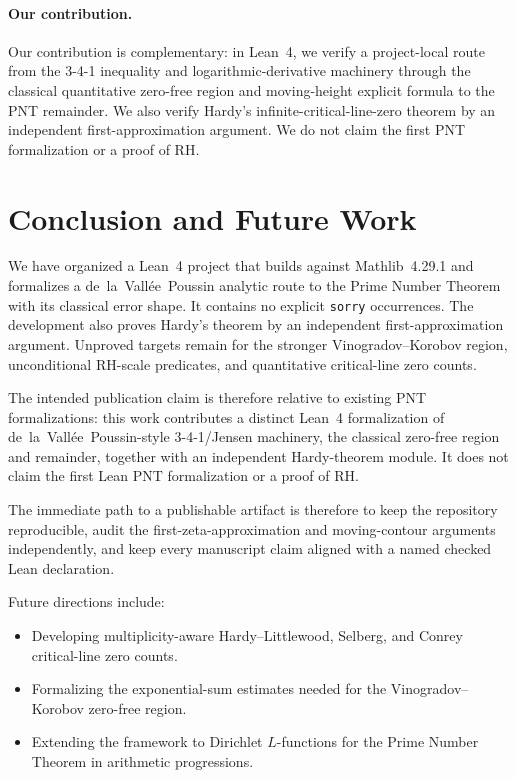 \documentclass[11pt,a4paper]{article}
\theoremstyle{remark}
\begin{document}
\paragraph{Our contribution.}
Our contribution is complementary: in Lean~4, we verify a project-local route
from the 3-4-1 inequality and logarithmic-derivative machinery through the
classical quantitative zero-free region and moving-height explicit formula to
the PNT remainder.  We also verify Hardy's infinite-critical-line-zero theorem
by an independent first-approximation argument.  We do not claim the first PNT
formalization or a proof of RH.

\section{Conclusion and Future Work}

We have organized a Lean~4 project that builds against Mathlib~4.29.1 and
formalizes a de~la~Vall\'ee~Poussin analytic route to the Prime Number Theorem
with its classical error shape.  It contains no explicit \texttt{sorry}
occurrences.  The development also proves Hardy's theorem by an independent
first-approximation argument.  Unproved targets remain for the stronger
Vinogradov--Korobov region, unconditional RH-scale predicates, and
quantitative critical-line zero counts.

The intended publication claim is therefore relative to existing PNT
formalizations: this work contributes a distinct Lean~4 formalization of
de~la~Vall\'ee~Poussin-style 3-4-1/Jensen machinery, the classical zero-free
region and remainder, together with an independent Hardy-theorem module.  It
does not claim the first Lean PNT formalization or a proof of RH.

The immediate path to a publishable artifact is therefore to keep the
repository reproducible, audit the first-zeta-approximation and moving-contour
arguments independently, and keep every manuscript claim aligned with a named
checked Lean declaration.

Future directions include:
\begin{itemize}[noitemsep]
  \item Developing multiplicity-aware Hardy--Littlewood, Selberg, and Conrey
    critical-line zero counts.
  \item Formalizing the exponential-sum estimates needed for the
    Vinogradov--Korobov zero-free region.
  \item Extending the framework to Dirichlet $L$-functions for the Prime
    Number Theorem in arithmetic progressions.
\end{itemize}
\end{document}
